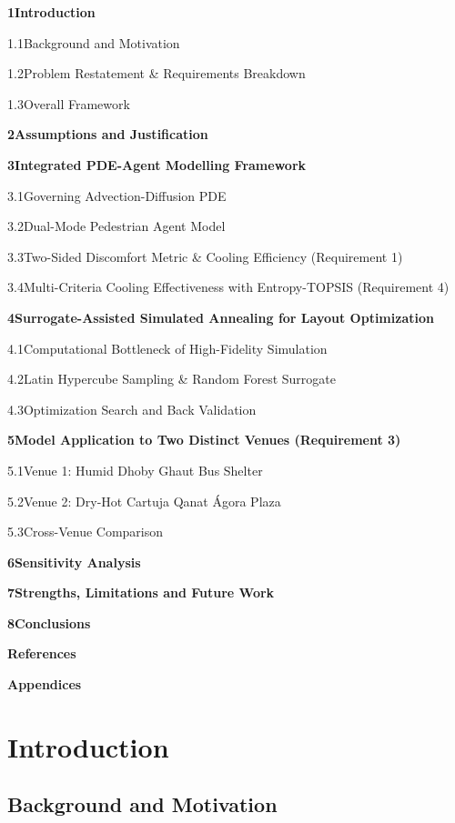 \documentclass[11pt]{article}
\begin{document}
\newcommand{\tocsec}[1]{\par\vspace{10pt}\noindent\textbf{#1}\hfill\par}
\newcommand{\tocsub}[1]{\par\noindent\hspace*{2.2em}#1\dotfill\par}

\tocsec{1\quad Introduction}
\tocsub{1.1\quad Background and Motivation}
\tocsub{1.2\quad Problem Restatement \& Requirements Breakdown}
\tocsub{1.3\quad Overall Framework}

\tocsec{2\quad Assumptions and Justification}

\tocsec{3\quad Integrated PDE-Agent Modelling Framework}
\tocsub{3.1\quad Governing Advection-Diffusion PDE}
\tocsub{3.2\quad Dual-Mode Pedestrian Agent Model}
\tocsub{3.3\quad Two-Sided Discomfort Metric \& Cooling Efficiency (Requirement 1)}
\tocsub{3.4\quad Multi-Criteria Cooling Effectiveness with Entropy-TOPSIS (Requirement 4)}

\tocsec{4\quad Surrogate-Assisted Simulated Annealing for Layout Optimization}
\tocsub{4.1\quad Computational Bottleneck of High-Fidelity Simulation}
\tocsub{4.2\quad Latin Hypercube Sampling \& Random Forest Surrogate}
\tocsub{4.3\quad Optimization Search and Back Validation}

\tocsec{5\quad Model Application to Two Distinct Venues (Requirement 3)}
\tocsub{5.1\quad Venue 1: Humid Dhoby Ghaut Bus Shelter}
\tocsub{5.2\quad Venue 2: Dry-Hot Cartuja Qanat \'Agora Plaza}
\tocsub{5.3\quad Cross-Venue Comparison}

\tocsec{6\quad Sensitivity Analysis}

\tocsec{7\quad Strengths, Limitations and Future Work}

\tocsec{8\quad Conclusions}

\tocsec{References}
\tocsec{Appendices}

\endgroup

\section{Introduction}

\subsection{Background and Motivation}
\end{document}
